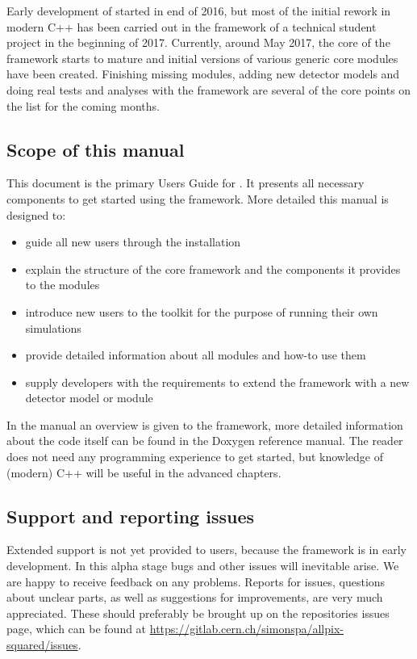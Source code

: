 Early development of \apsq started in end of 2016, but most of the initial rework in modern C++ has been carried out in the framework of a technical student project in the beginning of 2017. Currently, around May 2017, the core of the framework starts to mature and initial versions of various generic core modules have been created. Finishing missing modules, adding new detector models and doing real tests and analyses with the framework are several of the core points on the list for the coming months. 

\subsection{Scope of this manual}
This document is the primary Users Guide for \apsq. It presents all necessary components to get started using the framework. More detailed this manual is designed to:
\begin{itemize}
\item guide all new users through the installation 
\item explain the structure of the core framework and the components it provides to the modules
\item introduce new users to the toolkit for the purpose of running their own simulations
\item provide detailed information about all modules and how-to use them
\item supply developers with the requirements to extend the framework with a new detector model or module
\end{itemize}

In the manual an overview is given to the framework, more detailed information about the code itself can be found in the Doxygen reference manual. The reader does not need any programming experience to get started, but knowledge of (modern) C++ will be useful in the advanced chapters.

\subsection{Support and reporting issues}
Extended support is not yet provided to users, because the framework is in early development. In this alpha stage bugs and other issues will inevitable arise. We are happy to receive feedback on any problems. Reports for issues, questions about unclear parts, as well as suggestions for improvements, are very much appreciated. These should preferably be brought up on the repositories issues page, which can be found at \url{https://gitlab.cern.ch/simonspa/allpix-squared/issues}.
